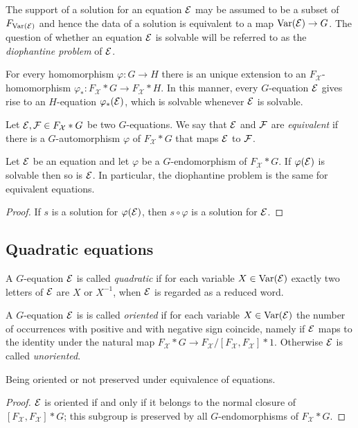 \documentclass[a4paper,11pt]{amsart}
\begin{document}
The support of a solution for an equation $\mathcal{E}$ may be assumed to be
a subset of $F_{\textup{Var}(\mathcal{E})}$ and hence the data of a solution
is equivalent to a map $\textup{Var}(\mathcal{E}) \to G$.  The question of whether an
equation $\mathcal{E}$ is solvable will be referred to as the \emph{diophantine
problem} of $\mathcal{E}$.

For every homomorphism $\varphi \colon G \to H$ there is an unique extension to an
$F_{\mathcal{X}}$-ho\-mo\-morphism $\varphi_* \colon F_{\mathcal{X}}*G \to F_{\mathcal{X}}*H$.
In this manner, every $G$-equation $\mathcal{E}$ gives rise to an $H$-equation $\varphi_*(\mathcal{E})$,
which is solvable whenever $\mathcal{E}$ is solvable.

\begin{defi}
  Let $\mathcal{E},\mathcal{F}\in F_{\mathcal{X}}* G$ be two $G$-equations. We say that $\mathcal{E}$ and $\mathcal{F}$ are
  \emph{equivalent} if there is a $G$-automorphism $\varphi$ of
  $F_{\mathcal{X}}*G$ that maps $\mathcal{E}$ to $\mathcal{F}$.
\end{defi}
\begin{lem}
  Let $\mathcal{E}$ be an equation and let $\varphi$ be a $G$-endomorphism of
  $F_{\mathcal{X}}*G$. If $\varphi(\mathcal{E})$ is solvable then so is $\mathcal{E}$. In particular,
  the diophantine problem is the same for equivalent equations.
\end{lem}
\begin{proof}
  If $s$ is a solution for $\varphi(\mathcal{E})$, then $s\circ\varphi$ is a
  solution for $\mathcal{E}$.
\end{proof}

\subsection{Quadratic equations}
A $G$-equation $\mathcal{E}$ is called \emph{quadratic} if for each variable
$X\in \textup{Var}(\mathcal{E})$ exactly two letters of $\mathcal{E}$ are $X$ or $X^{-1}$, when
$\mathcal{E}$ is regarded as a reduced word.

A $G$-equation $\mathcal{E}$ is is called \emph{oriented} if for each variable
$X\in \textup{Var}(\mathcal{E})$ the number of occurrences with positive and with
negative sign coincide, namely if $\mathcal{E}$ maps to the identity under the
natural map $F_{\mathcal{X}}*G\to F_{\mathcal{X}}/[F_{\mathcal{X}},F_{\mathcal{X}}]*1$. 
Otherwise $\mathcal{E}$ is called \emph{unoriented}.
\begin{lem}
 Being oriented or not preserved under equivalence of equations.
\end{lem}
\begin{proof}
  $\mathcal{E}$ is oriented if and only if it belongs to the normal closure of
  $[F_{\mathcal{X}},F_{\mathcal{X}}]*G$; this subgroup is preserved by all $G$-endomorphisms
  of $F_{\mathcal{X}}*G$.
\end{proof}
\end{document}
